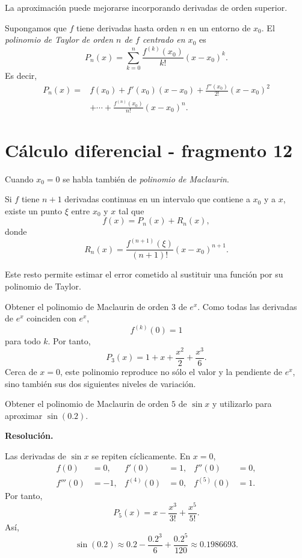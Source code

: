 La aproximación puede mejorarse incorporando derivadas de orden superior.

\begin{definition}
Supongamos que $f$ tiene derivadas hasta orden $n$ en un entorno de $x_0$. El \emph{polinomio de Taylor de orden $n$ de $f$ centrado en $x_0$} es
\[
P_n(x)
=
\sum_{k=0}^n\frac{f^{(k)}(x_0)}{k!}(x-x_0)^k.
\]
Es decir,
\begin{align*}
P_n(x)={}&f(x_0)+f'(x_0)(x-x_0)
+\frac{f''(x_0)}{2!}(x-x_0)^2\\
&+\cdots
+\frac{f^{(n)}(x_0)}{n!}(x-x_0)^n.
\end{align*}
\end{definition}


\section{Cálculo diferencial - fragmento 12}
Cuando $x_0=0$ se habla también de \emph{polinomio de Maclaurin}.

\begin{theorem}
Si $f$ tiene $n+1$ derivadas continuas en un intervalo que contiene a $x_0$ y a $x$, existe un punto $\xi$ entre $x_0$ y $x$ tal que
\[
f(x)=P_n(x)+R_n(x),
\]
donde
\[
R_n(x)=\frac{f^{(n+1)}(\xi)}{(n+1)!}(x-x_0)^{n+1}.
\]
\end{theorem}

Este resto permite estimar el error cometido al sustituir una función por su polinomio de Taylor.

\begin{example}
Obtener el polinomio de Maclaurin de orden $3$ de $e^x$. Como todas las derivadas de $e^x$ coinciden con $e^x$,
\[
f^{(k)}(0)=1
\]
para todo $k$. Por tanto,
\[
\boxed{
P_3(x)=1+x+\frac{x^2}{2}+\frac{x^3}{6}
}.
\]
Cerca de $x=0$, este polinomio reproduce no sólo el valor y la pendiente de $e^x$, sino también sus dos siguientes niveles de variación.
\end{example}

\begin{solvedexercise}
Obtener el polinomio de Maclaurin de orden $5$ de $\sin x$ y utilizarlo para aproximar $\sin(0.2)$.

\textbf{Resolución.}\par\smallskip
Las derivadas de $\sin x$ se repiten cíclicamente. En $x=0$,
\begin{align*}
f(0)&=0, & f'(0)&=1, & f''(0)&=0,\\
f'''(0)&=-1, & f^{(4)}(0)&=0, & f^{(5)}(0)&=1.
\end{align*}
Por tanto,
\[
P_5(x)=x-\frac{x^3}{3!}+\frac{x^5}{5!}.
\]
Así,
\[
\sin(0.2)
\approx
0.2-\frac{0.2^3}{6}+\frac{0.2^5}{120}
\approx0.1986693.
\]
\end{solvedexercise}

